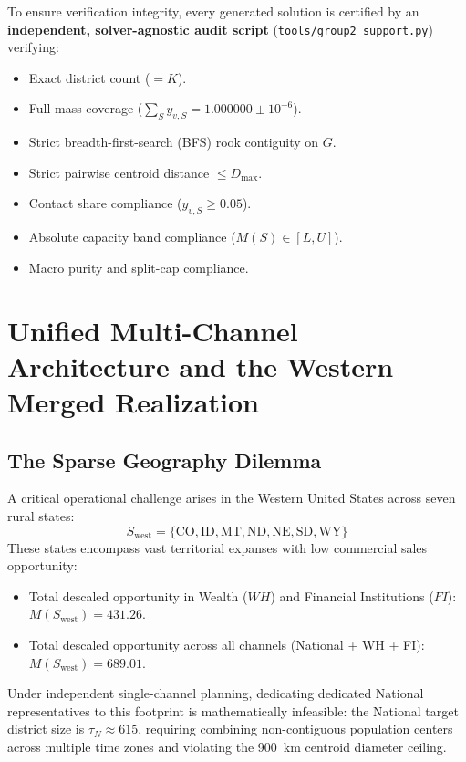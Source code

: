 \documentclass[11pt,a4paper]{article}
\theoremstyle{plain}
\theoremstyle{definition}
\begin{document}
To ensure verification integrity, every generated solution is certified by an \textbf{independent, solver-agnostic audit script} (\texttt{tools/group2\_support.py}) verifying:
\begin{itemize}[leftmargin=1.5em]
    \item Exact district count ($=K$).
    \item Full mass coverage ($\sum_{S} y_{v,S} = 1.000000 \pm 10^{-6}$).
    \item Strict breadth-first-search (BFS) rook contiguity on $G$.
    \item Strict pairwise centroid distance $\le D_{\max}$.
    \item Contact share compliance ($y_{v,S} \ge 0.05$).
    \item Absolute capacity band compliance ($M(S) \in [L, U]$).
    \item Macro purity and split-cap compliance.
\end{itemize}

\section{Unified Multi-Channel Architecture and the Western Merged Realization}

\subsection{The Sparse Geography Dilemma}
A critical operational challenge arises in the Western United States across seven rural states:
\begin{equation}
S_{\text{west}} = \{\text{CO}, \text{ID}, \text{MT}, \text{ND}, \text{NE}, \text{SD}, \text{WY}\}
\end{equation}
These states encompass vast territorial expanses with low commercial sales opportunity:
\begin{itemize}[leftmargin=1.5em]
    \item Total descaled opportunity in Wealth ($WH$) and Financial Institutions ($FI$): $M(S_{\text{west}}) = 431.26$.
    \item Total descaled opportunity across all channels (National + WH + FI): $M(S_{\text{west}}) = 689.01$.
\end{itemize}
Under independent single-channel planning, dedicating dedicated National representatives to this footprint is mathematically infeasible: the National target district size is $\tau_N \approx 615$, requiring combining non-contiguous population centers across multiple time zones and violating the 900~km centroid diameter ceiling.
\end{document}
